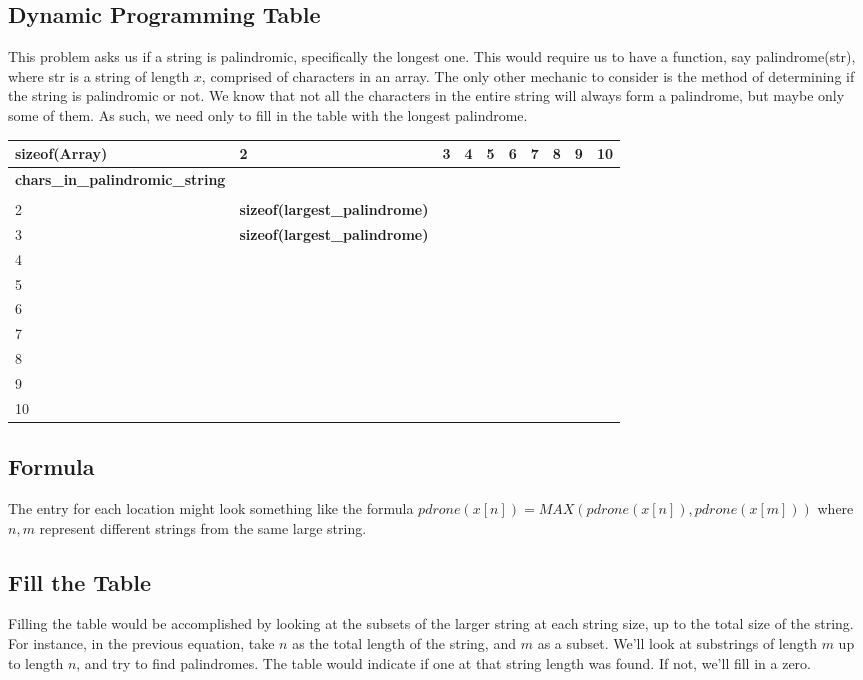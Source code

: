 \documentclass{article}
\begin{document}
\subsection{Dynamic Programming Table}
This problem asks us if a string is palindromic, specifically the longest one. This would require us to have a function, say palindrome(str), where str is a string of length $x$, comprised of characters in an array. The only other mechanic to consider is the method of determining if the string is palindromic or not. We know that not all the characters in the entire string will always form a palindrome, but maybe only some of them. As such, we need only to fill in the table with the longest palindrome.
\begin{table}[h]
\begin{tabular}{llllllllll}
\textbf{sizeof(Array)} & 2 & 3 & 4 & 5 & 6 & 7 & 8 & 9 & 10 \\ \hline
\multicolumn{1}{l|}{\textbf{chars\_in\_palindromic\_string}} &  &  &  &  &  &  &  &  &  \\
\multicolumn{1}{l|}{\textbf{}} &  &  &  &  &  &  &  &  &  \\
\multicolumn{1}{l|}{2} & \textbf{sizeof(largest\_palindrome)} &  &  &  &  &  &  &  &  \\
\multicolumn{1}{l|}{3} & \textbf{sizeof(largest\_palindrome)} &  &  &  &  &  &  &  &  \\
\multicolumn{1}{l|}{4} &  &  &  &  &  &  &  &  &  \\
\multicolumn{1}{l|}{5} &  &  &  &  &  &  &  &  &  \\
\multicolumn{1}{l|}{6} &  &  &  &  &  &  &  &  &  \\
\multicolumn{1}{l|}{7} &  &  &  &  &  &  &  &  &  \\
\multicolumn{1}{l|}{8} &  &  &  &  &  &  &  &  &  \\
\multicolumn{1}{l|}{9} &  &  &  &  &  &  &  &  &  \\
\multicolumn{1}{l|}{10} &  &  &  &  &  &  &  &  & 
\end{tabular}
\end{table}
\subsection{Formula} 
The entry for each location might look something like the formula $pdrone(x[n]) = MAX( pdrone(x[n]), pdrone(x[m]))$ where $n,m$ represent different strings from the same large string.
\subsection{Fill the Table}
Filling the table would be accomplished by looking at the subsets of the larger string at each string size, up to the total size of the string. For instance, in the previous equation, take $n$ as the total length of the string, and $m$ as a subset. We'll look at substrings of length $m$ up to length $n$, and try to find palindromes. The table would indicate if one at that string length was found. If not, we'll fill in a zero.
\end{document}
